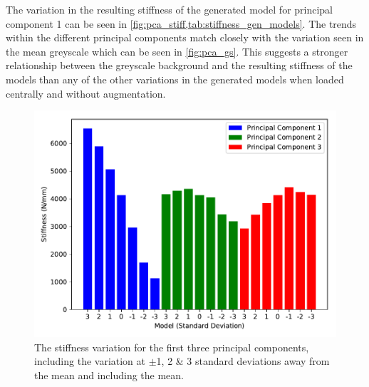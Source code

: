 The variation in the resulting stiffness of the generated model for principal
component 1 can be seen in \cref{fig:pca_stiff,tab:stiffness_gen_models}. The
trends within the different principal components  match closely with the
variation seen in the mean greyscale which can be seen in \cref{fig:pca_gs}.
This suggests a stronger relationship between the greyscale background and the
resulting stiffness of the models than any of the other variations in the
generated models when loaded centrally and without augmentation.

\begin{figure}[h]
  \centering
  \includegraphics[width=.9\textwidth]{Chapters/Chapter_PCA_images/pca_stiff.pdf}
  \caption{The stiffness variation for the first three principal components,
	including the variation at $\pm$1, 2 \& 3 standard deviations away from
	the mean and including the mean.}
  \label{fig:pca_stiff}
\end{figure}

